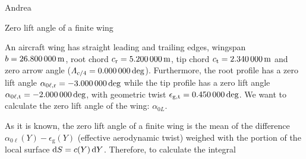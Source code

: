 \documentclass[[12pt,twoside]{book}
\begin{document}
%
Andrea 
\begin{myExampleX}{Zero lift angle of a finite wing}{}%
\label{example:Zero:Lift:Angle:Of:A:Finite:Wing}
%

%
An aircraft wing has straight leading and trailing edges, wingspan $b=\SI[round-precision=1]{\mySpanWingMT}{\metre}$,
root chord $c_\mathrm{r}=\SI[round-precision=2]{\myChordRootWingMT}{\metre}$,
tip chord $c_\mathrm{t}=\SI[round-precision=2]{\myChordTipWingMT}{\metre}$
and zero arrow angle ($\Lambda_{c/4}=\SI[round-precision=1]{\mySweepQuarterChordWingDEG}{\deg}$).
Furthermore, the root profile has a zero lift angle $\alpha_{0\ell,\mathrm{r}}=\SI[round-precision=1]{\myAlphaZeroLiftRootWingDEG}{\deg}$
while the tip profile has a zero lift angle
$\alpha_{0\ell,\mathrm{t}}=\SI[round-precision=1]{\myAlphaZeroLiftTipWingDEG}{\deg}$,
with geometric twist
$\epsilon_{\mathrm{g,t}}=\SI[round-precision=1]{\myTwistWingDEG}{\deg}$. We want to calculate the zero lift angle of the wing: $\alpha_{0L}$.

\medskip
As it is known, the zero lift angle of a finite wing is the mean of the difference $\alpha_{0\ell}(Y)-\epsilon_\mathrm{g}(Y)$ (effective aerodynamic twist) weighed with the portion of the local surface $\diff{S}=c(Y)\diff{Y}$. Therefore, to calculate the integral


\end{myExampleX}
\end{document}
